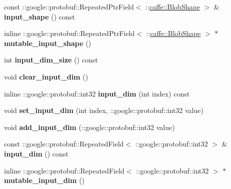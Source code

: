 \begin{DoxyCompactItemize}
const \+::google\+::protobuf\+::\+Repeated\+Ptr\+Field$<$ \+::\mbox{\hyperlink{classcaffe_1_1_blob_shape}{caffe\+::\+Blob\+Shape}} $>$ \& {\bfseries input\+\_\+shape} () const
\item 
\mbox{\label{classcaffe_1_1_net_parameter_a5a0faf29fffd0be77b07ac2cfd671d8b}} 
inline \+::google\+::protobuf\+::\+Repeated\+Ptr\+Field$<$ \+::\mbox{\hyperlink{classcaffe_1_1_blob_shape}{caffe\+::\+Blob\+Shape}} $>$ $\ast$ {\bfseries mutable\+\_\+input\+\_\+shape} ()
\item 
\mbox{\label{classcaffe_1_1_net_parameter_a8bc4fee5e3e2c3aa788e7ae9e2399eca}} 
int {\bfseries input\+\_\+dim\+\_\+size} () const
\item 
\mbox{\label{classcaffe_1_1_net_parameter_ac19d5925f177725a97471239b7552407}} 
void {\bfseries clear\+\_\+input\+\_\+dim} ()
\item 
\mbox{\label{classcaffe_1_1_net_parameter_a08aff28b5aaafab27596f57c49dfbc6c}} 
inline \+::google\+::protobuf\+::int32 {\bfseries input\+\_\+dim} (int index) const
\item 
\mbox{\label{classcaffe_1_1_net_parameter_a58304fec01a9ded9e0301de29f71ec74}} 
void {\bfseries set\+\_\+input\+\_\+dim} (int index, \+::google\+::protobuf\+::int32 value)
\item 
\mbox{\label{classcaffe_1_1_net_parameter_a056d33b237e86a871308a2f62a7ef4e3}} 
void {\bfseries add\+\_\+input\+\_\+dim} (\+::google\+::protobuf\+::int32 value)
\item 
\mbox{\label{classcaffe_1_1_net_parameter_aa6afa9663f112205355ba0a0af6f830e}} 
const \+::google\+::protobuf\+::\+Repeated\+Field$<$ \+::google\+::protobuf\+::int32 $>$ \& {\bfseries input\+\_\+dim} () const
\item 
\mbox{\label{classcaffe_1_1_net_parameter_a510a08702eec16fd616914a6429295a8}} 
inline \+::google\+::protobuf\+::\+Repeated\+Field$<$ \+::google\+::protobuf\+::int32 $>$ $\ast$ {\bfseries mutable\+\_\+input\+\_\+dim} ()

\end{DoxyCompactItemize}
